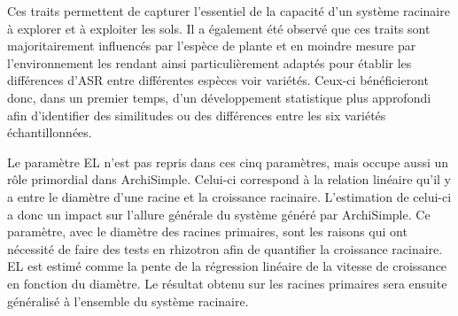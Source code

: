 Ces traits permettent de capturer l'essentiel de la capacité d'un système racinaire à explorer et à exploiter les sols.
Il a également été observé que ces traits sont majoritairement influencés par l'espèce de plante et en moindre mesure par l'environnement les rendant ainsi particulièrement adaptés pour établir les différences d'ASR entre différentes espèces voir variétés.
Ceux-ci bénéficieront donc, dans un premier temps, d'un développement statistique plus approfondi afin d'identifier des similitudes ou des différences entre les six variétés échantillonnées.
\newline

Le paramètre EL n'est pas repris dans ces cinq paramètres, mais occupe aussi un rôle primordial dans ArchiSimple.
Celui-ci correspond à la relation linéaire qu'il y a entre le diamètre d'une racine et la croissance racinaire.
L'estimation de celui-ci a donc un impact sur l'allure générale du système généré par ArchiSimple.
Ce paramètre, avec le diamètre des racines primaires, sont les raisons qui ont nécessité de faire des tests en rhizotron afin de quantifier la croissance racinaire.
EL est estimé comme la pente de la régression linéaire de la vitesse de croissance en fonction du diamètre.
Le résultat obtenu sur les racines primaires sera ensuite généralisé à l'ensemble du système racinaire.